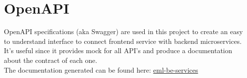 \section{OpenAPI}
OpenAPI specifications (aka Swagger) are used in this project to create an easy to
understand interface to connect frontend service with
backend microservices.
It's useful since it provides mock for all API's and produce a documentation about the contract of each one.\\
The documentation generated can be found here: \href{https://swexception.github.io/eml-be-services/}{eml-be-services}